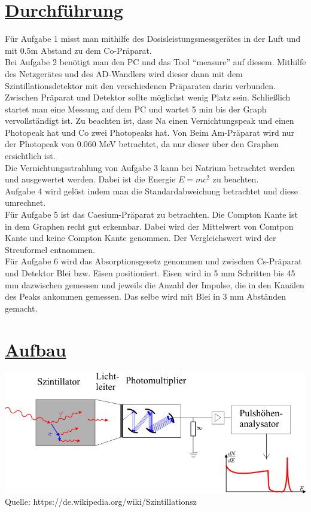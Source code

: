 \documentclass[11pt,a4paper]{article}
\begin{document}
 \section{\underline{Durchführung}}
  Für Aufgabe 1 misst man mithilfe des Dosisleistungsmessgerätes in der Luft und
  mit 0.5m Abstand zu dem Co-Präparat. \\
  Bei Aufgabe 2 benötigt man den PC und das Tool ``measure'' auf diesem.
  Mithilfe des Netzgerätes und des AD-Wandlers wird dieser dann mit dem Szintillationsdetektor
  mit den verschiedenen Präparaten darin verbunden.
  Zwischen Präparat und Detektor sollte möglichst wenig Platz sein.
  Schließlich startet man eine Messung auf dem PC und wartet 5 min bis der Graph vervollst\"andigt ist.
  Zu beachten ist, dass Na einen Vernichtungspeak und einen Photopeak hat und Co zwei Photopeaks hat.
  Von Beim Am-Präparat wird nur der Photopeak von 0.060 MeV betrachtet, da nur dieser über den Graphen ersichtlich   ist.
  \\Die Vernichtungsstrahlung von Aufgabe 3 kann bei Natrium betrachtet werden und ausgewertet werden.
  Dabei ist die Energie $E=mc^2$ zu beachten.
  \\Aufgabe 4 wird gelöst indem man die Standardabweichung betrachtet und diese umrechnet.
  \\Für Aufgabe 5 ist das Caesium-Präparat zu betrachten. Die Compton Kante ist
  in dem Graphen recht gut erkennbar. Dabei wird der Mittelwert von Comtpon Kante und keine Compton Kante genommen.
  Der Vergleichswert wird der Streuformel entnommen.
  \\Für Aufgabe 6 wird das Absorptionsgesetz genommen und zwischen Cs-Präparat und Detektor
  Blei bzw. Eisen positioniert. Eisen wird in 5 mm Schritten bis 45 mm dazwischen gemessen und jeweils die Anzahl
  der Impulse, die in den Kanälen des Peaks ankommen gemessen. Das selbe wird mit Blei in 3 mm Abständen gemacht.
\section{\underline{Aufbau}}
 \includegraphics{Bilder/Szint.png}
 \\ Quelle: https://de.wikipedia.org/wiki/Szintillationsz%
\newpage
\end{document}
